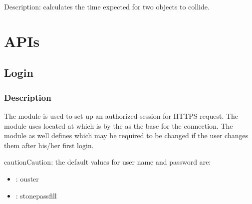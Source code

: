 \documentclass[letterpaper,10pt,english]{sphinxmanual}
\begin{document}

\begin{fulllineitems}
\label{\detokenize{processing:processing.utils.time_to_col}}
\pysigstartsignatures
{}
\pysigstopsignatures
\sphinxAtStartPar
Description: 
calculates the time expected for two objects to collide.

\end{fulllineitems}



\section{APIs}
\label{\detokenize{codedoc:apis}}\label{\detokenize{codedoc:apisection}}
\sphinxstepscope


\subsection{Login}
\label{\detokenize{gemini_login:login}}\label{\detokenize{gemini_login::doc}}

\subsubsection{Description}
\label{\detokenize{gemini_login:description}}
\sphinxAtStartPar
The module is used to set up an authorized session for HTTPS request.
The module uses  located at {\hyperref[\detokenize{connection::doc}]{}} which is by  the  as the base  for the connection.
The module as well defines  which may be required to be changed if the user changes them after his/her first login.

\begin{sphinxadmonition}{caution}{Caution:}
\sphinxAtStartPar
the default values for user name and password are:
\begin{itemize}
\item {} 
\sphinxAtStartPar
{} : ouster

\item {} 
\sphinxAtStartPar
{} : stone\sphinxhyphen{}pass\sphinxhyphen{}fill

\end{itemize}
\end{sphinxadmonition}
\label{\detokenize{gemini_login:module-gemini_login}}
\end{document}
